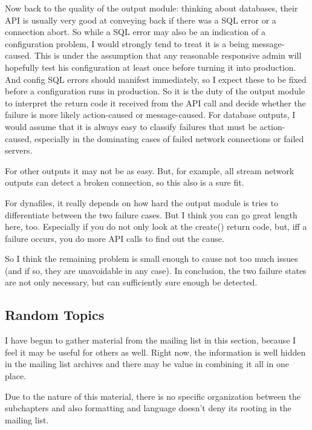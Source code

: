 \documentclass[a4paper,10pt]{article}
\begin{document}
Now back to the quality of the output module: thinking about databases, their
API is usually very good at conveying back if there was a SQL error or a
connection abort. So while a SQL error may also be an indication of a
configuration problem, I would strongly tend to treat it is a being
message-caused. This is under the assumption that any reasonable responsive
admin will hopefully test his configuration at least once before turning it
into production. And config SQL errors should manifest immediately, so I
expect these to be fixed before a configuration runs in production. So it is
the duty of the output module to interpret the return code it received from
the API call and decide whether the failure is more likely action-caused or
message-caused. For database outputs, I would assume that it is always easy
to classify failures that must be action-caused, especially in the
dominating cases of failed network connections or failed servers.

For other outputs it may not be as easy. But, for example, all stream network
outputs can detect a broken connection, so this also is a sure fit.

For dynafiles, it really depends on how hard the output module is tries to differentiate
between the two failure cases. But I think you can go great length here, too.
Especially if you do not only look at the create() return code, but, iff a
failure occurs, you do more API calls to find out the cause.

So I think the remaining problem is small enough to cause not too much issues
(and if so, they are unavoidable in any case). In conclusion, the two failure states are not only necessary, but can sufficiently sure enough be detected.

\subsection{Random Topics}
I have begun to gather material from the mailing list in this section, because I feel it may be useful for others as well. Right now, the information is well hidden in the mailing list archives and there may be value in combining it all in one place.

Due to the nature of this material, there is no specific organization between the subchapters and also formatting and language doesn't deny its rooting in the mailing list.
\end{document}
